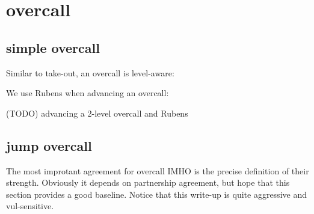 \section{overcall}

\subsection{simple overcall}

Similar to take-out, an overcall is level-aware:


We use Rubens when advancing an overcall:



(TODO) advancing a 2-level overcall and Rubens

\subsection{jump overcall}

The most improtant agreement for overcall IMHO is the precise definition of their strength.
Obviously it depends on partnership agreement, but hope that this section provides a good baseline.
Notice that this write-up is quite aggressive and vul-sensitive.


